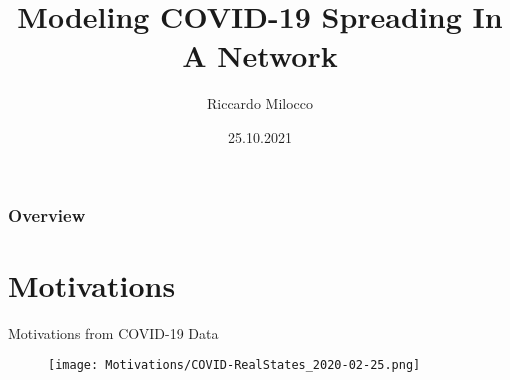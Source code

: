 \documentclass[xcolor={dvipsnames}, aspectratio = 43]{beamer}
\title[COVID-19 in Networks]{Modeling COVID-19 Spreading In A Network} %
\author{Riccardo Milocco} %
\institute[DFA - UniPD] %
{
{\normalsize Prof./Dr. Marco Baiesi} \\
\vspace{1cm}
{\normalsize Università Degli Studi di Padova} \\ %
\medskip
{\normalsize Dipartimento di Fisica e Astronomia G. Galilei} %
}
\date{25.10.2021} %
\begin{document}
\begin{frame}
\titlepage %
\end{frame}

\begin{frame}
\frametitle{Overview} %
\tableofcontents %
\end{frame}

\section{Motivations}
\begin{frame}{Motivations from COVID-19 Data}
	\begin{figure}[h]
		\centering
		\texttt{[image: Motivations/COVID-RealStates\_2020-02-25.png]}
	\end{figure}
\end{frame}
\end{document}

